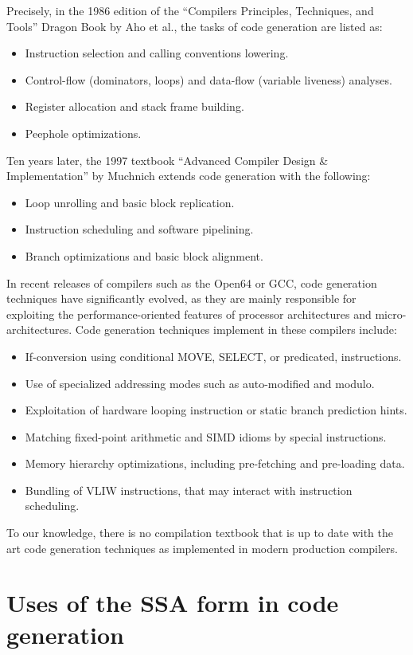 Precisely, in the 1986 edition of
the ``Compilers Principles, Techniques, and Tools'' Dragon Book by Aho et al.,
the tasks of code generation are listed as:
\begin{itemize}
\item Instruction selection and calling conventions lowering.
\item Control-flow (dominators, loops) and data-flow (variable liveness) analyses.
\item Register allocation and stack frame building.
\item Peephole optimizations.
\end{itemize}
Ten years later, the 1997 textbook ``Advanced Compiler Design \& Implementation''
by Muchnich extends code generation with the following: \begin{itemize}
\item Loop unrolling and basic block replication.
\item Instruction scheduling and software pipelining.
\item Branch optimizations and basic block alignment.
\end{itemize}
In recent releases of compilers such as the Open64 or GCC, code generation
techniques have significantly evolved, as they are mainly responsible for
exploiting the performance-oriented features of processor architectures and
micro-architectures. Code generation techniques implement in these compilers
include: \begin{itemize}
\item If-conversion using conditional MOVE, SELECT, or predicated, instructions.
\item Use of specialized addressing modes such as auto-modified and modulo.
\item Exploitation of hardware looping instruction or static branch prediction
hints.
\item Matching fixed-point arithmetic and SIMD idioms by special instructions.
\item Memory hierarchy optimizations, including pre-fetching and pre-loading
data.
\item Bundling of VLIW instructions, that may interact with instruction
scheduling.
\end{itemize}
To our knowledge, there is no compilation textbook that is up to date with the
art code generation techniques as implemented in modern production compilers.
\medskip

\section{Uses of the SSA form in code generation}

